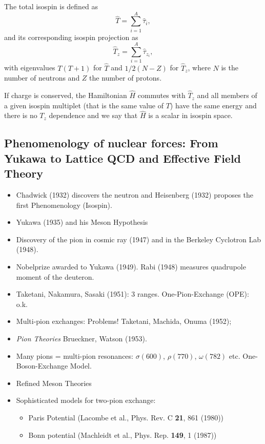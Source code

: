 \documentclass[%
oneside,                 %
final,                   %
10pt]{article}
\begin{document}
The total isospin is defined as
\[
\hat{T}=\sum_{i=1}^A\hat{\tau}_i,
\]
and its corresponding isospin projection as
\[
\hat{T}_z=\sum_{i=1}^A\hat{\tau}_{z_i},
\]
with eigenvalues $T(T+1)$ for $\hat{T}$ and $1/2(N-Z)$ for $\hat{T}_z$, where $N$ is the number of neutrons and $Z$ the number of protons. 

If charge is conserved, the Hamiltonian $\hat{H}$ commutes with $\hat{T}_z$ and all members of a given isospin multiplet
(that is the same value of $T$) have the same energy and there is no $T_z$ dependence and we say that $\hat{H}$ is a scalar in isospin space.

\subsection*{Phenomenology of nuclear forces: From Yukawa to Lattice QCD and Effective Field Theory}


\begin{itemize}
\item Chadwick (1932) discovers the neutron and Heisenberg (1932) proposes the first Phenomenology (Isospin).  

\item Yukawa (1935) and his Meson Hypothesis       

\item Discovery of the pion in cosmic ray (1947) and in the Berkeley Cyclotron Lab (1948).

\item Nobelprize awarded to Yukawa (1949).  Rabi (1948) measures quadrupole moment of the deuteron.

\item Taketani, Nakamura, Sasaki (1951): 3 ranges.      One-Pion-Exchange (OPE): o.k.

\item Multi-pion exchanges: Problems!   Taketani, Machida, Onuma (1952);

\item \emph{Pion Theories} Brueckner, Watson (1953).

\item Many pions = multi-pion resonances: $\sigma(600)$,  $\rho(770)$,  $\omega(782)$ etc. One-Boson-Exchange Model.

\item Refined Meson Theories

\item Sophisticated models for two-pion exchange:
\begin{itemize}

      \item Paris Potential (Lacombe et al., Phys. Rev. C \textbf{21}, 861 (1980))

      \item Bonn potential (Machleidt et al., Phys. Rep. \textbf{149}, 1 (1987))
\end{itemize}

\noindent
\end{itemize}
\end{document}
